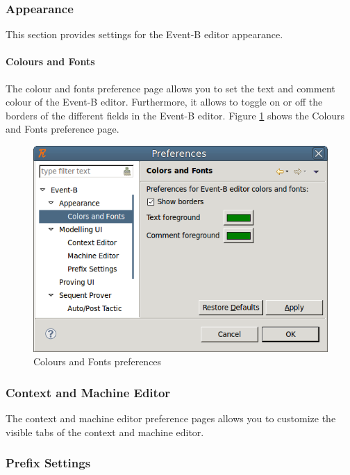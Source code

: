 \subsubsection{Appearance}

This section provides settings for the Event-B editor appearance.

\paragraph{Colours and Fonts}

The colour and fonts preference page allows you to set the text and comment colour of the Event-B editor. Furthermore, it allows to toggle on or off the borders of the different fields in the Event-B editor. Figure \ref{fig_ref_01_preferences13} shows the Colours and Fonts preference page.

\begin{figure}[!ht]
\begin{center}
	\includegraphics{img/reference/ref_01_preferences13.png}
	\caption{Colours and Fonts preferences}
	\label{fig_ref_01_preferences13}
\end{center}
\end{figure}

\subsubsection{Context and Machine Editor}

The context and machine editor preference pages allows you to customize the visible tabs of the context and machine editor.

\subsubsection{Prefix Settings}

